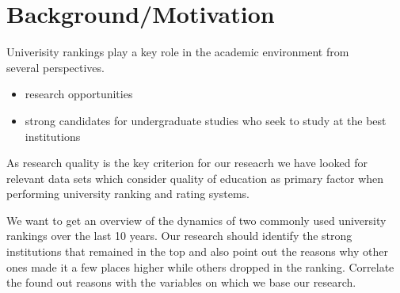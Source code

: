 \section{Background/Motivation}\label{sec:background}

Univerisity rankings play a key role in the academic environment from\\ several perspectives.
\begin{itemize}
	\item research opportunities
	\item strong candidates for undergraduate studies who seek to study at the
		best institutions
\end{itemize}
 As research quality is the key criterion for our reseacrh we have looked for
 relevant data sets which consider quality of education as primary factor when
 performing university ranking and rating systems.


We want to get an overview of the dynamics of two commonly used university rankings over the last 10 years.
Our research should identify the strong institutions that remained in the top and also point out the reasons why other ones made it a few places higher while others dropped in the ranking. Correlate the found out reasons with the variables on which we base our research.